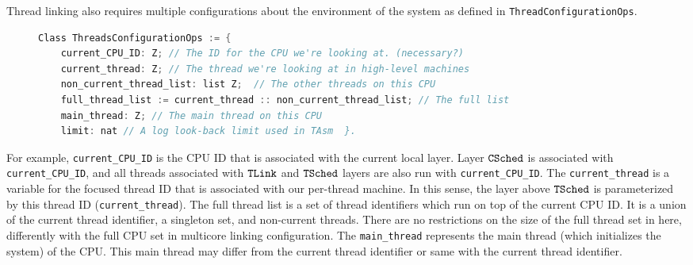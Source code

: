 
Thread linking also requires multiple configurations about the environment of the system as defined in \lstinline$ThreadConfigurationOps$.
\begin{figure}
\begin{lstlisting}[language=C, morekeywords={Class}]
Class ThreadsConfigurationOps := {      
    current_CPU_ID: Z; // The ID for the CPU we're looking at. (necessary?) 
    current_thread: Z; // The thread we're looking at in high-level machines
    non_current_thread_list: list Z;  // The other threads on this CPU 
    full_thread_list := current_thread :: non_current_thread_list; // The full list
    main_thread: Z; // The main thread on this CPU 
    limit: nat // A log look-back limit used in TAsm  }.
\end{lstlisting}
\end{figure}
For example, \lstinline$current_CPU_ID$ is the CPU ID that is 
associated with the current local layer.
Layer ${{\mathrm{\texttt{CSched}}}}$ is associated with \lstinline$current_CPU_ID$, 
and all threads associated with ${{\mathrm{\texttt{TLink}}}}$ and ${{\mathrm{\texttt{TSched}}}}$ layers 
are also run with  \lstinline$current_CPU_ID$.
The \lstinline$current_thread$ is a variable for the focused thread ID that is associated with our per-thread machine.
In this sense, the layer above ${{\mathrm{\texttt{TSched}}}}$ is parameterized by this thread ID (\lstinline$current_thread$). 
The full thread list is a set of thread identifiers which run on top of the current CPU ID. 
It is a union of the current thread identifier, a singleton set, 
and non-current threads. 
There are no restrictions on the size of the full thread set in here,
differently with the full CPU set in multicore linking configuration.
The \lstinline$main_thread$ represents the main thread (which initializes the system) of the CPU. 
This main thread may differ from the current thread identifier or same with the current thread identifier.

